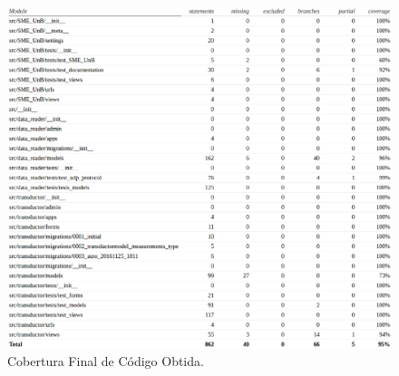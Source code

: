 \begin{figure}[!htpb]
    \centering
    \includegraphics[keepaspectratio=true,scale=0.5]{figuras/cobertura05.eps}
    \caption{Cobertura Final de Código Obtida. }
    \label{cobertura05}
\end{figure}